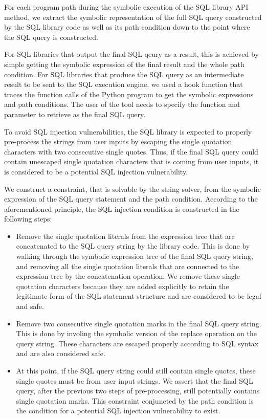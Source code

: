 \documentclass[conference]{IEEEtran}
\begin{document}
For each program path during the symbolic execution of the SQL library API method, we extract the symbolic representation of the full SQL query constructed by the SQL library code as well as its path condition down to the point where the SQL query is constructed. 

For SQL libraries that output the final SQL qeury as a result, this is achieved by simple getting the symbolic expression of the final result and the whole path condition.
For SQL libraries that produce the SQL query as an intermediate result to be sent to the SQL execution engine, we used a hook function that traces the function calls of the Python program to get the symbolic expressions and path conditions. The user of the tool needs to specify the function and parameter to retrieve as the final SQL query.

To avoid SQL injection vulnerabilities, the SQL library is expected to properly pre-process the strings from user inputs by escaping the single quotation characters with two consecutive single quotes. Thus, if the final SQL query could contain unescaped single quotation characters that is coming from user inputs, it is considered to be a potential SQL injection vulnerability.

We construct a constraint, that is solvable by the string solver, from the symbolic expression of the SQL query statement and the path condition. According to the aforementioned principle, the SQL injection condition is constructed in the following steps:

\begin{itemize}

\item Remove the single quotation literals from the expression tree that are concatenated to the SQL query string by the library code. This is done by walking through the symbolic expression tree of the final SQL query string, and removing all the single quotation literals that are connected to the expression tree by the concatenation operation. We remove these single quotation characters because they are added explicitly to retain the legitimate form of the SQL statement structure and are considered to be legal and safe.

\item Remove two consecutive single quotation marks in the final SQL query string. This is done by involing the symbolic version of the replace operation on the query string. These characters are escaped properly according to SQL syntax and are also considered safe.

\item At this point, if the SQL query string could still contain single quotes, these single quotes must be from user input strings. We assert that the final SQL query, after the previous two steps of pre-processing, still potentially contains single quotation marks. This constraint conjuncted by the path condition is the condition for a potential SQL injection vulnerability to exist. 

\end{itemize}
\end{document}
